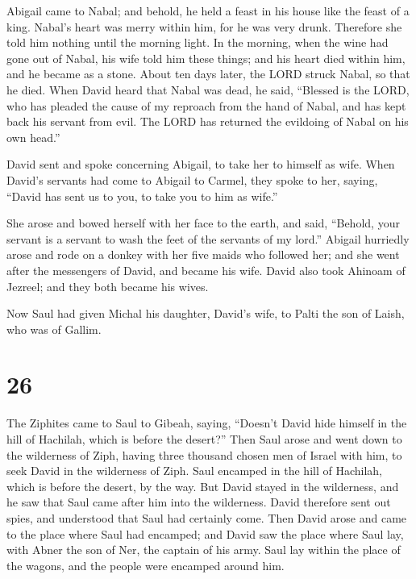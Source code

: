  Abigail came to Nabal; and behold, he held a feast in his
house like the feast of a king. Nabal's heart was merry within him, for
he was very drunk. Therefore she told him nothing until the morning
light.  In the morning, when the wine had gone out of
Nabal, his wife told him these things; and his heart died within him,
and he became as a stone.  About ten days later, the LORD
struck Nabal, so that he died.  When David heard that Nabal
was dead, he said, ``Blessed is the LORD, who has pleaded the cause of
my reproach from the hand of Nabal, and has kept back his servant from
evil. The LORD has returned the evildoing of Nabal on his own head.''

David sent and spoke concerning Abigail, to take her to himself as wife.
 When David's servants had come to Abigail to Carmel, they
spoke to her, saying, ``David has sent us to you, to take you to him as
wife.''

 She arose and bowed herself with her face to the earth,
and said, ``Behold, your servant is a servant to wash the feet of the
servants of my lord.''  Abigail hurriedly arose and rode on
a donkey with her five maids who followed her; and she went after the
messengers of David, and became his wife.  David also took
Ahinoam of Jezreel; and they both became his wives.

 Now Saul had given Michal his daughter, David's wife, to
Palti the son of Laish, who was of Gallim.

\hypertarget{section-25}{%
\section{26}\label{section-25}}

 The Ziphites came to Saul to Gibeah, saying, ``Doesn't
David hide himself in the hill of Hachilah, which is before the
desert?''  Then Saul arose and went down to the wilderness
of Ziph, having three thousand chosen men of Israel with him, to seek
David in the wilderness of Ziph.  Saul encamped in the hill
of Hachilah, which is before the desert, by the way. But David stayed in
the wilderness, and he saw that Saul came after him into the wilderness.
 David therefore sent out spies, and understood that Saul
had certainly come.  Then David arose and came to the place
where Saul had encamped; and David saw the place where Saul lay, with
Abner the son of Ner, the captain of his army. Saul lay within the place
of the wagons, and the people were encamped around him.

